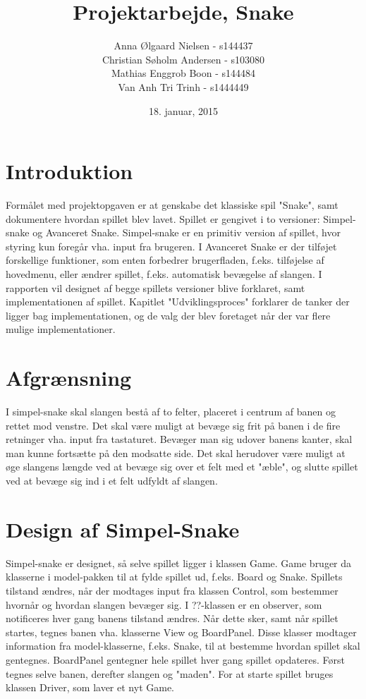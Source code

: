 \documentclass{report}
\begin{document}
\setcounter{chapter}{1}

\title{Projektarbejde, Snake}
\date{18. januar, 2015}
\author{	Anna Ølgaard Nielsen - s144437\\
			Christian Søholm Andersen - s103080\\
			Mathias Enggrob Boon - s144484\\
			Van Anh Tri Trinh - s1444449}
\maketitle

\tableofcontents
\newpage

\section{Introduktion}
Formålet med projektopgaven er at genskabe det klassiske spil "Snake", samt dokumentere hvordan spillet blev lavet.
Spillet er gengivet i to versioner: Simpel-snake og Avanceret Snake. Simpel-snake er en primitiv version af spillet, hvor styring kun foregår vha. input fra brugeren. I Avanceret Snake er der tilføjet forskellige funktioner, som enten forbedrer brugerfladen, f.eks. tilføjelse af hovedmenu, eller ændrer spillet, f.eks. automatisk bevægelse af slangen.
I rapporten vil designet af begge spillets versioner blive forklaret, samt implementationen af spillet. Kapitlet "Udviklingsproces" forklarer de tanker der ligger bag implementationen, og de valg der blev foretaget når der var flere mulige implementationer.

\section{Afgrænsning}
I simpel-snake skal slangen bestå af to felter, placeret i centrum af banen og rettet mod venstre. Det skal være muligt at bevæge sig frit på banen i de fire retninger vha. input fra tastaturet. Bevæger man sig udover banens kanter, skal man kunne fortsætte på den modsatte side. Det skal herudover være muligt  at øge slangens længde ved at bevæge sig over et felt med et "æble", og slutte spillet ved at bevæge sig ind i et felt udfyldt af slangen.

\section{Design af Simpel-Snake}
Simpel-snake er designet, så selve spillet ligger i klassen Game. Game bruger da klasserne i model-pakken til at fylde spillet ud, f.eks. Board og Snake. Spillets tilstand ændres, når der modtages input fra klassen Control, som bestemmer hvornår og hvordan slangen bevæger sig. I ??-klassen er en observer, som notificeres hver gang banens tilstand ændres. Når dette sker, samt når spillet startes, tegnes banen vha. klasserne View og BoardPanel. Disse klasser modtager information fra model-klasserne, f.eks. Snake, til at bestemme hvordan spillet skal gentegnes. BoardPanel gentegner hele spillet hver gang spillet opdateres. Først tegnes selve banen, derefter slangen og "maden". 
For at starte spillet bruges klassen Driver, som laver et nyt Game.
\end{document}
